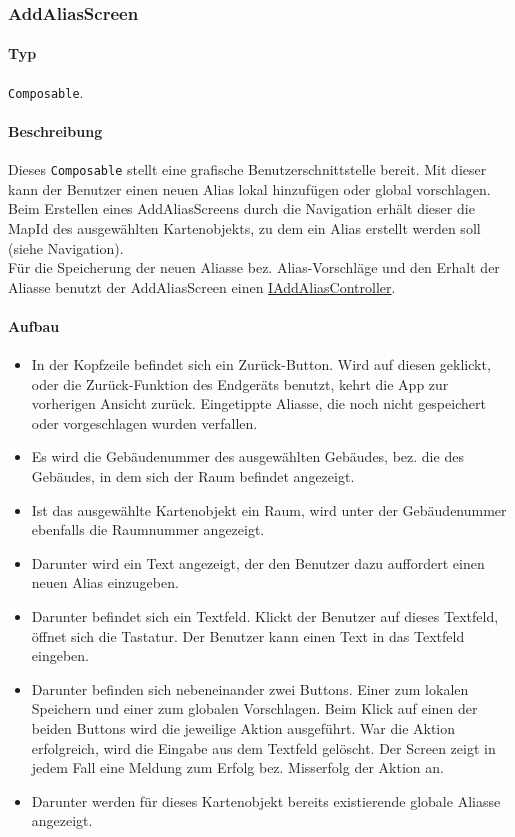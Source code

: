 \subsubsection{AddAliasScreen}\label{App_AddAlias_AddAliasScreen}
\paragraph*{Typ}
\texttt{Composable}.
\paragraph*{Beschreibung}
Dieses \texttt{Composable} stellt eine grafische Benutzerschnittstelle bereit.
Mit dieser kann der Benutzer einen neuen Alias lokal hinzufügen oder global vorschlagen.\\
Beim Erstellen eines AddAliasScreens durch die Navigation erhält dieser die MapId 
des ausgewählten Kartenobjekts, zu dem ein Alias erstellt werden soll (siehe Navigation).\\
Für die Speicherung der neuen Aliasse bez. Alias-Vorschläge und den Erhalt der Aliasse benutzt 
der AddAliasScreen einen \hyperref[App_AddAlias_IAddAliasController]{IAddAliasController}.

\paragraph*{Aufbau}
\begin{itemize}
    \item In der Kopfzeile befindet sich ein Zurück-Button. Wird auf diesen geklickt, oder die Zurück-Funktion des Endgeräts benutzt, 
    kehrt die App zur vorherigen Ansicht zurück. Eingetippte Aliasse, die noch nicht gespeichert oder vorgeschlagen wurden verfallen.
    \item Es wird die Gebäudenummer des ausgewählten Gebäudes, bez. die des Gebäudes, in dem sich der Raum befindet angezeigt.
    \item Ist das ausgewählte Kartenobjekt ein Raum, wird unter der Gebäudenummer ebenfalls die Raumnummer angezeigt.
    \item Darunter wird ein Text angezeigt, der den Benutzer dazu auffordert einen neuen Alias einzugeben.
    \item Darunter befindet sich ein Textfeld. Klickt der Benutzer auf dieses Textfeld, öffnet sich die Tastatur. 
    Der Benutzer kann einen Text in das Textfeld eingeben.
    \item Darunter befinden sich nebeneinander zwei Buttons. Einer zum lokalen Speichern und einer zum globalen Vorschlagen. 
    Beim Klick auf einen der beiden Buttons wird die jeweilige Aktion ausgeführt. War die Aktion erfolgreich, wird die Eingabe 
    aus dem Textfeld gelöscht. Der Screen zeigt in jedem Fall eine Meldung zum Erfolg bez. Misserfolg der Aktion an.
    \item Darunter werden für dieses Kartenobjekt bereits existierende globale Aliasse angezeigt.
\end{itemize}
